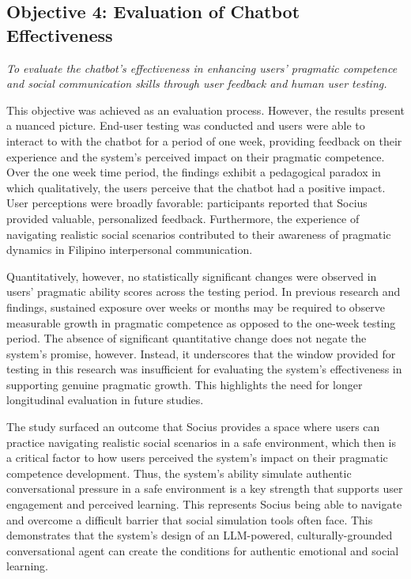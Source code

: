 \subsection*{Objective 4: Evaluation of Chatbot Effectiveness}

\textit{To evaluate the chatbot's effectiveness in enhancing users' pragmatic
competence and social communication skills through user feedback and human user
testing.}

\medskip

This objective was achieved as an evaluation process. However, the results
present a nuanced picture. End-user testing was conducted and users were able to interact to
with the chatbot for a period of one week, providing feedback on their experience and the system's
perceived impact on their pragmatic competence. Over the one week time period, the findings exhibit a
pedagogical paradox in which qualitatively, the users perceive that the chatbot had a positive impact. User perceptions 
were broadly favorable: participants reported that Socius provided valuable, personalized feedback. Furthermore, the experience of
navigating realistic social scenarios contributed to their awareness of pragmatic
dynamics in Filipino interpersonal communication.

Quantitatively, however, no statistically significant changes were observed in
users' pragmatic ability scores across the testing period. In previous research and findings,
sustained exposure over weeks or months may be required to observe measurable growth in pragmatic 
competence as opposed to the one-week testing period. The absence of significant quantitative change
does not negate the system's promise, however. Instead, it underscores that the window provided for testing in this research was 
insufficient for evaluating the system's effectiveness in supporting genuine pragmatic growth. This highlights the need for longer
longitudinal evaluation in future studies.

The study surfaced an outcome that Socius provides a space where users can practice navigating realistic social scenarios in a safe environment, which then 
is a critical factor to how users perceived the system's impact on their pragmatic competence development. Thus, the system's ability simulate authentic conversational pressure
in a safe environment is a key strength that supports user engagement and perceived learning. This represents Socius being able to navigate and overcome a difficult
barrier that social simulation tools often face. This demonstrates that the system's design of an LLM-powered, culturally-grounded conversational agent
can create the conditions for authentic emotional and social learning.

